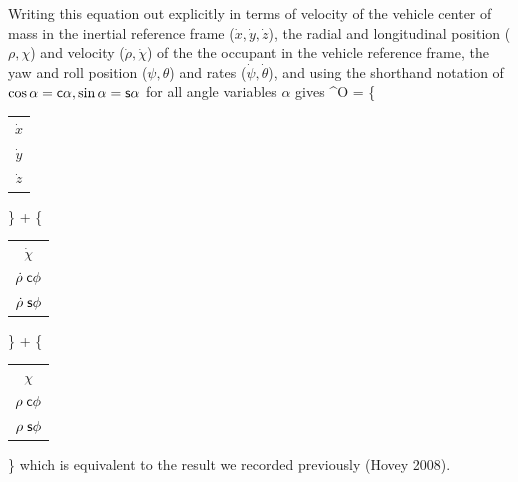 \documentclass[10pt,twocolumn,reqno]{amsart}
\begin{document}
Writing this equation out explicitly in terms of velocity of the vehicle center
of mass in the inertial reference frame ($\dot{x}, \dot{y}, \dot{z}$), 
the radial and longitudinal position ($\rho, \chi$) and velocity 
($\dot{\rho}, \dot{\chi}$)
of the the occupant in the vehicle reference frame,
the yaw and roll position ($\psi, \theta$) and rates ($\dot{\psi}, \dot{\theta}$), 
and using the shorthand notation of 
$\cos \alpha = \sf c \alpha, \sin \alpha = \sf s \alpha$ 
for all angle variables $\alpha$ gives
\be
{}\vv^{O} 
= 
\left\{  
	\begin{tabular}{c}
 	  	$\dot{x}$ \\ 
 		$\dot{y}$ \\ 
 		$\dot{z}$
 	\end{tabular}
\right\}
+
\left\{  
	\begin{tabular}{c}
 	  	$\dot{\chi}$ \\ 
 		$\dot{\rho} \; \hcos \phi$ \\ 
 		$\dot{\rho} \; \hsin \phi$
 	\end{tabular}
\right\}
+
\nonumber
\ee
\be
{}
\left\{  
	\begin{tabular}{c}
 	  	$\chi$ \\ 
 		$\rho \; \hcos \phi$ \\ 
 		$\rho \; \hsin \phi$
 	\end{tabular}
\right\}
\label{eq:velocityExpanded}
\ee
which is equivalent to the result we recorded previously (Hovey 2008).
\end{document}
